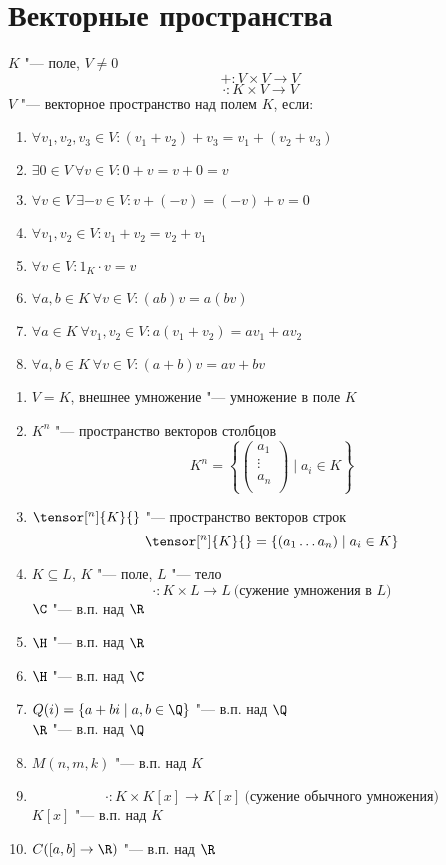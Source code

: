 
\section{Векторные пространства}

\begin{Def}
	$K$ "--- поле, $V \ne 0$
	\[ + \colon V \times V \to V \]
	\[ \cdot \colon K \times V \to V \]
	$V$ "--- векторное пространство над полем $K$, если:
	\begin{enumerate}
	\item
		$\forall v_1, v_2, v_3 \in V \colon (v_1 + v_2) + v_3 = v_1 + (v_2 + v_3)$
	\item
		$\exists 0 \in V ~ \forall v \in V \colon 0 + v = v + 0 = v$
	\item
		$\forall v \in V ~ \exists -v \in V \colon v + (-v) = (-v) + v = 0$
	\item
		$\forall v_1, v_2 \in V \colon v_1 + v_2 = v_2 + v_1$
	\item
		$\forall v \in V \colon 1_{K} \cdot v = v$
	\item
		$\forall a,b \in K ~ \forall v \in V \colon (ab)v = a(bv)$
	\item
		$\forall a \in K ~ \forall v_1, v_2 \in V \colon a(v_1 + v_2) = av_1 + av_2$
	\item
		$\forall a,b \in K ~ \forall v \in V \colon (a + b)v = av + bv$
	\end{enumerate}
\end{Def}

\begin{exmp}
	\begin{enumerate}
	\item
		$V = K$, внешнее умножение "--- умножение в поле $K$
	\item
		$K^n$ "--- пространство векторов столбцов
		\[ K^n = \left\{
			\begin{pmatrix}
				a_1\\
				\vdots\\
				a_n\\
			\end{pmatrix}
			\mid a_i \in K
		\right\} \]
	\item
		$\tensor[^n]{K}{}$ "--- пространство векторов строк
		\[ \tensor[^n]{K}{} = \left\{
			( a_1 \dots a_n) \mid a_i \in K
		\right\} \]
	\item
		$K \subseteq L$, $K$ "--- поле, $L$ "--- тело
		\[ \cdot \colon K \times L \to L ~ \text{(сужение умножения в $L$)} \]
		$\C$ "--- в.п. над $\R$
	\item
		$\H$ "--- в.п. над $\R$
	\item
		$\H$ "--- в.п. над $\C$
	\item
		$Q(i) = \{ a + bi \mid a,b \in \Q \}$ "--- в.п. над $\Q$ \\
		$\R$ "--- в.п. над $\Q$
	\item
		$M(n,m,k)$ "--- в.п. над $K$
	\item
		\[ \cdot \colon K \times K[x] \to K[x] ~ \text{(сужение обычного умножения)} \]
		$K[x]$ "--- в.п. над $K$
	\item
		$C([a,b] \to \R)$ "--- в.п. над $\R$
	\end{enumerate}
\end{exmp}

